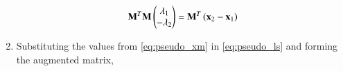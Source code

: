 \begin{enumerate}[label=\thesection.\arabic*.,ref=\thesection.\theenumi]
\begin{align}
    \mathbf{M}^T\mathbf{M}\begin{pmatrix}\lambda_1\\-\lambda_2\end{pmatrix} = \mathbf{M}^T\left(\mathbf{x}_2-\mathbf{x}_1\right)
\label{eq:pseudo_ls}
\end{align}
\item Substituting the values from \eqref{eq:pseudo_xm} in \eqref{eq:pseudo_ls} and forming the augmented matrix,
\begin{align}

\end{align}
\end{enumerate}
